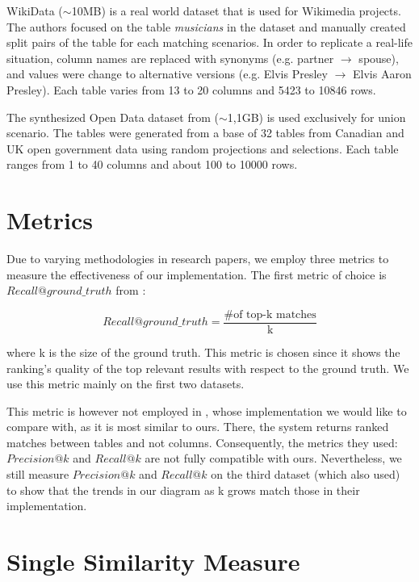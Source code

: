 WikiData ($\sim$10MB) is a real world dataset that is used for Wikimedia projects. The authors focused on the table \textit{musicians} in the dataset and manually created split pairs of the table for each matching scenarios. In order to replicate a real-life situation, column names are replaced with synonyms (e.g. partner $\rightarrow$ spouse), and values were change to alternative versions (e.g. Elvis Presley $\rightarrow$ Elvis Aaron Presley). Each table varies from 13 to 20 columns and 5423 to 10846 rows.

The synthesized Open Data dataset from \cite{tusZhu} ($\sim$1,1GB) is used exclusively for union scenario. The tables were generated from a base of 32 tables from Canadian and UK open government data using random projections and selections. Each table ranges from 1 to 40 columns and about 100 to 10000 rows.

\section{Metrics}

Due to varying methodologies in research papers, we employ three metrics to measure the effectiveness of our implementation. The first metric of choice is $Recall@ground\_truth$ from \cite{valentine}:

\[Recall@ground\_truth = \frac{\text{\# of top-k matches}}{\text{k}}\]

where k is the size of the ground truth. This metric is chosen since it shows the ranking's quality of the top relevant results with respect to the ground truth. We use this metric mainly on the first two datasets.

This metric is however not employed in \cite{d3l}, whose implementation we would like to compare with, as it is most similar to ours. There, the system returns ranked matches between tables and not columns. Consequently, the metrics they used: $Precision@k$ and $Recall@k$ are not fully compatible with ours. Nevertheless, we still measure $Precision@k$ and $Recall@k$ on the third dataset (which \cite{d3l} also used) to show that the trends in our diagram as k grows match those in their implementation.

\section{Single Similarity Measure}

